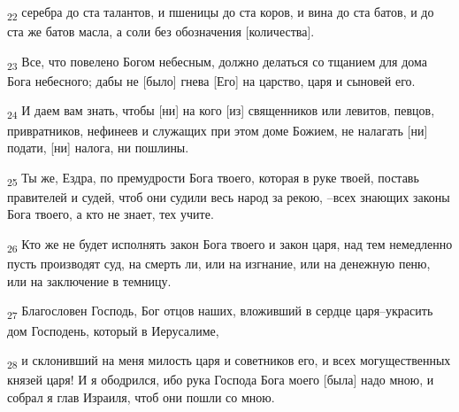 \begin{tcolorbox}
\textsubscript{22} серебра до ста талантов, и пшеницы до ста коров, и вина до ста батов, и до ста же батов масла, а соли без обозначения [количества].
\end{tcolorbox}
\begin{tcolorbox}
\textsubscript{23} Все, что повелено Богом небесным, должно делаться со тщанием для дома Бога небесного; дабы не [было] гнева [Его] на царство, царя и сыновей его.
\end{tcolorbox}
\begin{tcolorbox}
\textsubscript{24} И даем вам знать, чтобы [ни] на кого [из] священников или левитов, певцов, привратников, нефинеев и служащих при этом доме Божием, не налагать [ни] подати, [ни] налога, ни пошлины.
\end{tcolorbox}
\begin{tcolorbox}
\textsubscript{25} Ты же, Ездра, по премудрости Бога твоего, которая в руке твоей, поставь правителей и судей, чтоб они судили весь народ за рекою, --всех знающих законы Бога твоего, а кто не знает, тех учите.
\end{tcolorbox}
\begin{tcolorbox}
\textsubscript{26} Кто же не будет исполнять закон Бога твоего и закон царя, над тем немедленно пусть производят суд, на смерть ли, или на изгнание, или на денежную пеню, или на заключение в темницу.
\end{tcolorbox}
\begin{tcolorbox}
\textsubscript{27} Благословен Господь, Бог отцов наших, вложивший в сердце царя--украсить дом Господень, который в Иерусалиме,
\end{tcolorbox}
\begin{tcolorbox}
\textsubscript{28} и склонивший на меня милость царя и советников его, и всех могущественных князей царя! И я ободрился, ибо рука Господа Бога моего [была] надо мною, и собрал я глав Израиля, чтоб они пошли со мною.
\end{tcolorbox}
